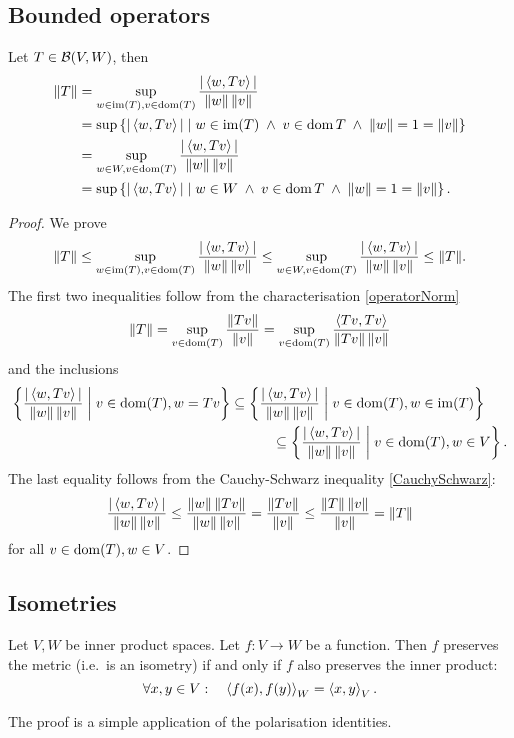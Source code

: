 \subsection{Bounded operators}
\begin{lemma} \label{operatorNormInnerProduct}
Let $T\in\operatorname{\mathcal{B}}(V,W)$, then
\begin{align*}
\lVert T\rVert &= \sup_{w\in \operatorname{im}(T),v \in \operatorname{dom}(T)} \frac{|\left\langle w,Tv \right\rangle|}{\lVert w\rVert\,\lVert v\rVert} \\
&= \sup\left\{ |\left\langle w,Tv \right\rangle| \;\middle|\; w\in \operatorname{im}(T)\;\land\; v\in\operatorname{dom}{T}\;\land\; \lVert w\rVert = 1 = \lVert v\rVert \right\} \\
&= \sup_{w\in W,v \in \operatorname{dom}(T)} \frac{|\left\langle w,Tv \right\rangle|}{\lVert w\rVert\,\lVert v\rVert} \\
&= \sup\left\{ |\left\langle w,Tv \right\rangle| \;\middle|\; w\in W\;\land\; v\in\operatorname{dom}{T}\;\land\; \lVert w\rVert = 1 = \lVert v\rVert \right\}.
\end{align*}
\end{lemma}
\begin{proof}
We prove
\[ \lVert T\rVert \leq \sup_{w\in \operatorname{im}(T),v \in \operatorname{dom}(T)} \frac{|\left\langle w,Tv \right\rangle|}{\lVert w\rVert\,\lVert v\rVert} \leq \sup_{w\in W,v \in \operatorname{dom}(T)} \frac{|\left\langle w,Tv \right\rangle|}{\lVert w\rVert\,\lVert v\rVert} \leq \lVert T\rVert. \]
The first two inequalities follow from the characterisation \ref{operatorNorm}
\[ \lVert T\rVert = \sup_{v \in \operatorname{dom}(T)} \frac{\lVert Tv\rVert}{\lVert v\rVert} = \sup_{v \in \operatorname{dom}(T)} \frac{\left\langle Tv,Tv \right\rangle}{\lVert Tv\rVert\,\lVert v\rVert} \]
and the inclusions
\begin{align*}
\left\{ \frac{|\left\langle w,Tv \right\rangle|}{\lVert w\rVert\,\lVert v\rVert} \;\middle|\; v\in\operatorname{dom}(T), w = Tv \right\} &\subseteq \left\{ \frac{|\left\langle w,Tv \right\rangle|}{\lVert w\rVert\,\lVert v\rVert} \;\middle|\; v\in\operatorname{dom}(T), w\in\operatorname{im}(T) \right\}\\
&\qquad\quad\subseteq \left\{ \frac{|\left\langle w,Tv \right\rangle|}{\lVert w\rVert\,\lVert v\rVert} \;\middle|\; v\in\operatorname{dom}(T), w\in V \right\}.
\end{align*}
The last equality follows from the Cauchy-Schwarz inequality \ref{CauchySchwarz}:
\[ \frac{|\left\langle w,Tv \right\rangle|}{\lVert w\rVert\,\lVert v\rVert} \leq \frac{\lVert w\rVert\,\lVert Tv\rVert}{\lVert w\rVert\,\lVert v\rVert} = \frac{\lVert Tv\rVert}{\lVert v\rVert} \leq \frac{\lVert T\rVert\,\lVert v\rVert}{\lVert v\rVert} = \lVert T\rVert \]
for all $v\in\operatorname{dom}(T), w\in V$. 
\end{proof}

\subsection{Isometries}
\begin{lemma}
Let $V,W$ be inner product spaces. Let $f:V\to W$ be a function. Then $f$ preserves the metric (i.e.\ is an isometry) \textup{if and only if} $f$ also preserves the inner product:
\[ \forall x,y \in V: \quad \left\langle f(x),f(y) \right\rangle_W = \left\langle x,y \right\rangle_V. \]
\end{lemma}
The proof is a simple application of the polarisation identities.

